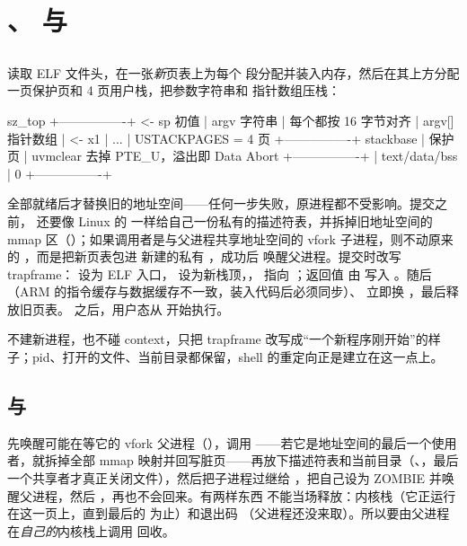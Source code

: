 \section{、 与 }

\subsection{}

 读取 ELF 文件头，在一张\emph{新}页表上为每个  段分配并装入内存，然后在其上方分配一页保护页和 4 页用户栈，把参数字符串和  指针数组压栈：

\begin{txtcode}
sz_top +----------------+  <- sp 初值
       | argv 字符串     |  每个都按 16 字节对齐
       | argv[] 指针数组 |  <- x1
       |  ...           |  USTACKPAGES = 4 页
       +----------------+  stackbase
       | 保护页          |  uvmclear 去掉 PTE_U，溢出即 Data Abort
       +----------------+
       | text/data/bss  |
0      +----------------+
\end{txtcode}

全部就绪后才替换旧的地址空间——任何一步失败，原进程都不受影响。提交之前， 还要像 Linux 的  一样给自己一份私有的描述符表，并拆掉旧地址空间的 mmap 区（）；如果调用者是与父进程共享地址空间的 vfork 子进程，则不动原来的 ，而是把新页表包进  新建的私有 ，成功后  唤醒父进程。提交时改写 trapframe： 设为 ELF 入口， 设为新栈顶，， 指向 ；返回值  由  写入 。随后 （ARM 的指令缓存与数据缓存不一致，装入代码后必须同步）、 立即换 ，最后释放旧页表。 之后，用户态从  开始执行。

 不建新进程，也不碰 context，只把 trapframe 改写成“一个新程序刚开始”的样子；pid、打开的文件、当前目录都保留，shell 的重定向正是建立在这一点上。

\subsection{ 与 }

 先唤醒可能在等它的 vfork 父进程（），调用 ——若它是地址空间的最后一个使用者，就拆掉全部 mmap 映射并回写脏页——再放下描述符表和当前目录（、，最后一个共享者才真正关闭文件），然后把子进程过继给 ，把自己设为 ZOMBIE 并唤醒父进程，然后 ，再也不会回来。有两样东西  不能当场释放：内核栈（它正运行在这一页上，直到最后的  为止）和退出码 （父进程还没来取）。所以要由父进程在\emph{自己的}内核栈上调用  回收。

